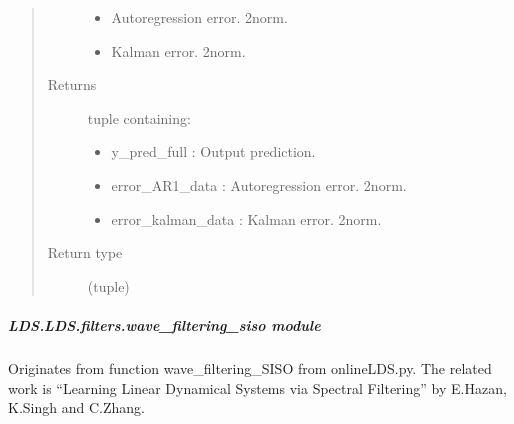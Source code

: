 \documentclass[letterpaper,10pt,english]{sphinxmanual}
\begin{document}
\begin{fulllineitems}
\begin{fulllineitems}
\begin{quote}
\begin{description}
\begin{itemize}
\item {} 
\sphinxAtStartPar
{} \textendash{} Auto\sphinxhyphen{}regression error. 2\sphinxhyphen{}norm.

\item {} 
\sphinxAtStartPar
{} \textendash{} Kalman error. 2\sphinxhyphen{}norm.

\end{itemize}

\item[{Returns}] \leavevmode
\sphinxAtStartPar

\sphinxAtStartPar
tuple containing:
\begin{itemize}
\item {} 
\sphinxAtStartPar
y\_pred\_full       : Output prediction.

\item {} 
\sphinxAtStartPar
error\_AR1\_data    : Auto\sphinxhyphen{}regression error. 2\sphinxhyphen{}norm.

\item {} 
\sphinxAtStartPar
error\_kalman\_data : Kalman error. 2\sphinxhyphen{}norm.

\end{itemize}


\item[{Return type}] \leavevmode
\sphinxAtStartPar
(tuple)

\end{description}\end{quote}

\end{fulllineitems}


\end{fulllineitems}



\subparagraph{LDS.LDS.filters.wave\_filtering\_siso module}
\label{\detokenize{LDS.LDS.filters:module-LDS.LDS.filters.wave_filtering_siso}}\label{\detokenize{LDS.LDS.filters:lds-lds-filters-wave-filtering-siso-module}}
\sphinxAtStartPar
Originates from function wave\_filtering\_SISO from onlineLDS.py.
The related work is “Learning Linear Dynamical Systems via Spectral Filtering”
by E.Hazan, K.Singh and C.Zhang.
\end{document}
